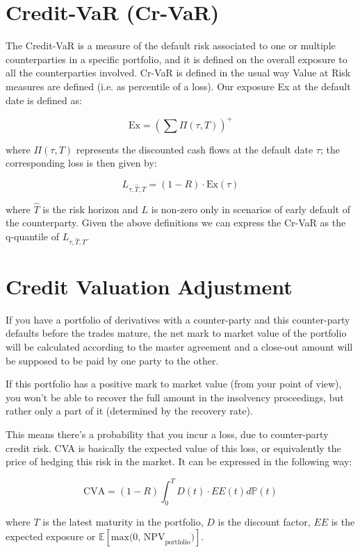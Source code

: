 \section{Credit-VaR (Cr-VaR)}\label{credit-var-cr-var}

The Credit-VaR is a measure of the default risk associated to one or
multiple counterparties in a specific portfolio, and it is defined on
the overall exposure to all the counterparties involved. Cr-VaR is
defined in the usual way Value at Risk measures are defined (i.e. as
percentile of a loss). Our exposure Ex at the default date is defined
as:

\[ \textrm{Ex} = (\sum \Pi(\tau, T))^{+}\]

where \(\Pi(\tau,T)\) represents the discounted cash flows at the
default date \(\tau\); the corresponding loss is then given by:

\[L_{\tau, \hat{T}, T} = (1 - R) \cdot \textrm{Ex}(\tau)\]

where \(\hat{T}\) is the risk horizon and \(L\) is non-zero only in
scenarios of early default of the counterparty. Given the above
definitions we can express the Cr-VaR as the q-quantile of
\(L_{\tau, \hat{T}, T}\).

\section{Credit Valuation
Adjustment}\label{credit-valuation-adjustment}

If you have a portfolio of derivatives with a counter-party and this
counter-party defaults before the trades mature, the net mark to market
value of the portfolio will be calculated according to the master
agreement and a close-out amount will be supposed to be paid by one
party to the other.

If this portfolio has a positive mark to market value (from your point
of view), you won't be able to recover the full amount in the insolvency
proceedings, but rather only a part of it (determined by the recovery
rate).

This means there's a probability that you incur a loss, due to
counter-party credit risk. CVA is basically the expected value of this
loss, or equivalently the price of hedging this risk in the market. It
can be expressed in the following way:

\[ \text{CVA} = (1-R) \int_0^T D(t) \cdot EE(t) d\mathbb{P}(t) \]

where \(T\) is the latest maturity in the portfolio, \(D\) is the
discount factor, \(EE\) is the expected exposure or
\(\mathbb{E}[\text{max(0, NPV}_\text{portfolio})]\).

